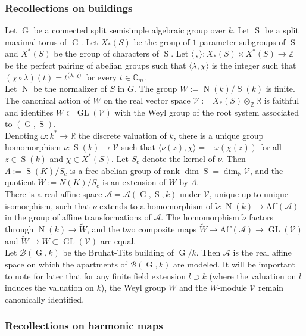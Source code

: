 \documentclass[11pt,letterpaper]{amsart}
\def\bZ{\mathbb{Z}}
\def\bR{\mathbb{R}}
\def\bG{\mathbb{G}}
\def\bZ{\mathbb{Z}}
\def\cA{\mathcal{A}}
\def\cV{\mathcal{V}}
\theoremstyle{plain}
\DeclareMathOperator{\rG}{G}
\DeclareMathOperator{\rN}{N}
\DeclareMathOperator{\rS}{S}
\DeclareMathOperator{\GL}{GL}
\begin{document}
\subsubsection{Recollections on buildings}
Let $\rG$ be a connected split semisimple algebraic group over $k$. Let $\rS$ be a split maximal torus of $\rG$. Let $X_\ast(S)$ be the group of $1$-parameter subgroups of $\rS$ and $X^\ast(S)$ be the group of characters of $\rS$. Let $ \langle \, ,  \rangle \colon X_\ast(S) \times X^\ast(S) \to \bZ$ be the perfect pairing of abelian groups such that $\langle \lambda, \chi \rangle$ is the integer such that $\left(\chi \circ \lambda \right) (t) = t^{\langle \lambda, \chi \rangle}$ for every $t \in \bG_m$. \\
Let $\rN$ be the normalizer of $S$ in $G$. The group $W := \rN(k) / \rS(k)$ is finite. The canonical action of $W$ on the real vector space $\cV := X_\ast(S) \otimes _\bZ \bR$ is faithful and identifies $W \subset \GL(\cV)$ with the Weyl group of the root system associated to $(\rG, \rS)$.\\
Denoting $\omega \colon k^\ast \to \bR$ the discrete valuation of $k$, there is a unique group homomorphism $\nu \colon \rS(k) \to \cV$ such that $ \langle \nu(z), \chi \rangle = - \omega (\chi(z)) $ for all $z \in \rS(k)$ and $\chi \in X^\ast(S)$. Let $S_c$ denote the kernel of $\nu$. Then $\Lambda := \rS(K) / S_c$ is a free abelian group of rank $\dim \rS = \dim_\bR \cV$, and the quotient $\tilde W := N(K)/ S_c$ is an extension of $W$ by $\Lambda$.\\
There is a real affine space $\cA = \cA(\rG, \rS, k)$ under $\cV$, unique up to unique isomorphism, such that $\nu$ extends to a homomorphism of $\tilde \nu \colon \rN(k) \to \mathrm{Aff}(\cA)$ in the group of affine transformations of $\cA$. The homomorphism $\tilde \nu$ factors through $\rN(k) \to \tilde W$, and the two composite maps $\tilde W \to \mathrm{Aff}(\cA) \to \GL(\cV)$ and $\tilde W \to W \subset \GL(\cV)$ are equal.\\
Let $\mathscr{B}(\rG, k)$ be the Bruhat-Tits building of $\rG / k$. Then $\cA$ is the real affine space on which the apartments of $\mathscr{B}(\rG, k)$ are modeled. It will be important to note for later that for any finite field extension $l \supset k$ (where the valuation on $l$ induces the valuation on $k$), the Weyl group $W$ and the $W$-module $\cV$ remain canonically identified. 

\subsubsection{Recollections on harmonic maps}
\end{document}
